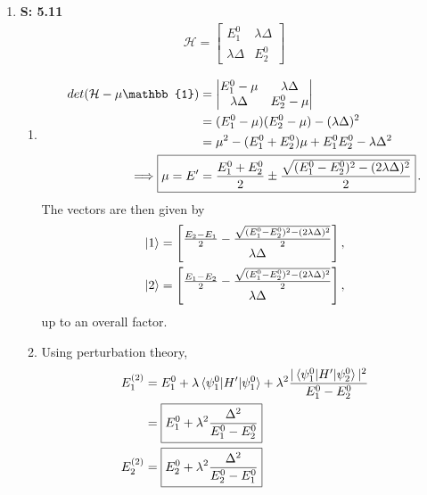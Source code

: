 \documentclass[12pt, letterpaper]{article}
\begin{document}
\begin{enumerate}
     
\item[] \textbf{S: 5.11}
\begin{align}
    \mathcal{H} = \begin{bmatrix}
        E_1^0 & \lambda\Delta\\
        \lambda\Delta & E_2^0
    \end{bmatrix}
\end{align}
\begin{enumerate}
\item 
\begin{align}
    det(\mathcal{H}-\mu\mathbb{1}) &= \begin{vmatrix}
        E_1^0-\mu & \lambda\Delta\\
        \lambda\Delta & E_2^0-\mu
    \end{vmatrix}\\
    &= (E_1^0-\mu)(E_2^0-\mu) -(\lambda\Delta)^2\\
    &= \mu^2 -(E_1^0+E_2^0)\mu +E_1^0E_2^0-\lambda\Delta^2\\
    \implies \Aboxed{\mu =E'&= \frac{E_1^0+E_2^0}{2}\pm \frac{\sqrt{(E_1^0-
    E_2^0)^2-(2\lambda\Delta)^2}}{2}}\hspace{.5mm}.
\end{align}
The vectors are then given by
\begin{align}
    \ket{1} &= \begin{bmatrix}
        \frac{E_2-E_1}{2}- \frac{\sqrt{(E_1^0-E_2^0)^2-(2\lambda\Delta)^2}}{2}\\
        \lambda\Delta
    \end{bmatrix},\\
    \ket{2} &= \begin{bmatrix}
        \frac{E_1-E_2}{2}- \frac{\sqrt{(E_1^0-E_2^0)^2-(2\lambda\Delta)^2}}{2}\\
        \lambda\Delta
    \end{bmatrix},
\end{align}
up to an overall factor.
\item
Using perturbation theory,
\begin{align}
E_1^{(2)} &= E_1^0 + \lambda\braket{\psi_1^0|H'|\psi_1^0} + \lambda^2
    \frac{|\braket{\psi_1^0|H'|\psi_2^0}|^2}{E_1^0-E_2^0}\\
&= \boxed{E_1^0 + \lambda^2\frac{\Delta^2}{E_1^0-E_2^0}}\\
E_2^{(2)} &= \boxed{E_2^0 + \lambda^2\frac{\Delta^2}{E_2^0-E_1^0}}

\end{align}
\end{enumerate}
\end{enumerate}
\end{document}
